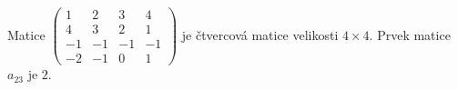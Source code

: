 \wikitextrule
\begin{example}\label{MAI:exam033}
  Matice \(\begin{pmatrix}1&2&3&4\\4&3&2&1\\-1&-1&-1&-1\\-2&-1&0&1\end{pmatrix}\) je čtvercová 
  matice velikosti \(4\times4\). Prvek matice \(a_{23}\) je \(2\).
\end{example}
